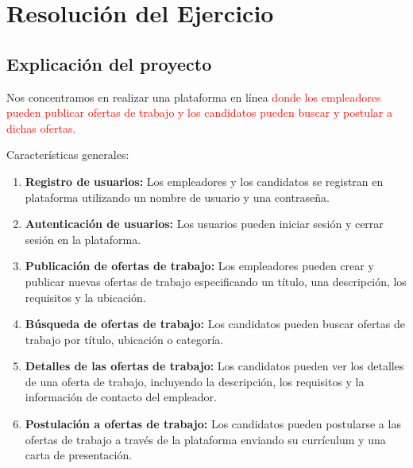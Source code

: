 \documentclass{article}
\begin{document}
	\section{Resolución del Ejercicio}
	\subsection{Explicación del proyecto}
    \begin{itemize}	
    \item Nos concentramos en realizar una plataforma en línea \textcolor{red}{donde los empleadores pueden publicar ofertas de trabajo y los candidatos pueden buscar y postular a dichas ofertas.}
    
    \begin{minipage}{0.6\textwidth}
        \item Características generales:
        \begin{enumerate}
            \item \textbf{Registro de usuarios:} Los empleadores y los candidatos se registran en plataforma utilizando un nombre de usuario y una contraseña.
            \item \textbf{Autenticación de usuarios:} Los usuarios pueden iniciar sesión y cerrar sesión en la plataforma.
            \item \textbf{Publicación de ofertas de trabajo:} Los empleadores pueden crear y publicar nuevas ofertas de trabajo especificando un título, una descripción, los requisitos y la ubicación.
            \item \textbf{Búsqueda de ofertas de trabajo:} Los candidatos pueden buscar ofertas de trabajo por título, ubicación o categoría.
            \item \textbf{Detalles de las ofertas de trabajo:} Los candidatos pueden ver los detalles de una oferta de trabajo, incluyendo la descripción, los requisitos y la información de contacto del empleador.
            \item \textbf{Postulación a ofertas de trabajo:} Los candidatos pueden postularse a las ofertas de trabajo a través de la plataforma enviando su currículum y una carta de presentación.
        \end{enumerate}
    \end{minipage}
    \hspace{20pt}
    \begin{minipage}{0.4\textwidth}

\end{minipage}
\end{itemize}
\end{document}
